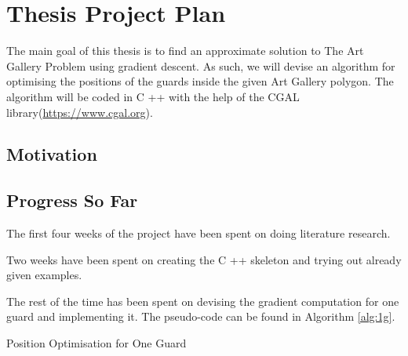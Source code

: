 \section{Thesis Project Plan}
\label{sec:thesis}

The main goal of this thesis is to find an approximate solution to The Art Gallery Problem \cite{o1987art} using gradient descent. As such, we will devise an algorithm for optimising the positions of the guards inside the given Art Gallery polygon. 
The algorithm will be coded in C ++ with the help of the CGAL library(\url{https://www.cgal.org}).

\subsection{Motivation}

\subsection{Progress So Far}
The first four weeks of the project have been spent on doing literature research.

Two weeks have been spent on creating the C ++ skeleton and trying out already given examples.

The rest of the time has been spent on devising the gradient computation for one guard and implementing it.
The pseudo-code can be found in Algorithm \ref{alg:1g}.

\begin{algorithm}
    \begin{algorithmic}[1]
    \caption{Position Optimisation for One Guard}
    \label{alg:1g}

         

            \EndIf
        \EndWhile
    \EndFor
    \end{algorithmic}
\end{algorithm}

